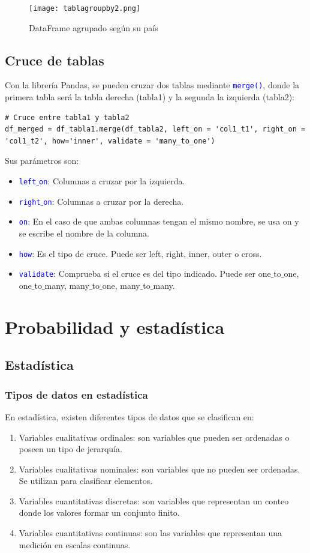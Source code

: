 \documentclass[a4paper, 12pt]{book}
\begin{document}
\begin{figure}[H] 
	\centering 
	\texttt{[image: tablagroupby2.png]}
	\caption{DataFrame agrupado según su país}
\end{figure}

\subsection{Cruce de tablas}
Con la librería Pandas, se pueden cruzar dos tablas mediante \texttt{\textcolor{blue}{merge()}}, donde la primera tabla será la tabla derecha (tabla1) y la segunda la izquierda (tabla2):
\begin{verbatim}
# Cruce entre tabla1 y tabla2
df_merged = df_tabla1.merge(df_tabla2, left_on = 'col1_t1', right_on = 'col1_t2', how='inner', validate = 'many_to_one')
\end{verbatim}
Sus parámetros son:
\begin{itemize}
	\item \texttt{\textcolor{blue}{left$\_$on}}: Columnas a cruzar por la izquierda.
	\item \texttt{\textcolor{blue}{right$\_$on}}: Columnas a cruzar por la derecha.
	\item \texttt{\textcolor{blue}{on}}: En el caso de que ambas columnas tengan el mismo nombre, se usa on y se escribe el nombre de la columna.
	\item \texttt{\textcolor{blue}{how}}: Es el tipo de cruce. Puede ser left, right, inner, outer o cross.
	\item \texttt{\textcolor{blue}{validate}}: Comprueba si el cruce es del tipo indicado. Puede ser one$\_$to$\_$one, one$\_$to$\_$many, many$\_$to$\_$one, many$\_$to$\_$many.
\end{itemize}

\section{Probabilidad y estadística}
\subsection{Estadística}
\subsubsection{Tipos de datos en estadística}
En estadística, existen diferentes tipos de datos que se clasifican en:
\begin{enumerate}
	\item Variables cualitativas ordinales: son variables que pueden ser ordenadas o poseen un tipo de jerarquía.
	\item Variables cualitativas nominales: son variables que no pueden ser ordenadas. Se utilizan para clasificar elementos.
	\item Variables cuantitativas discretas: son variables que representan un conteo donde los valores formar un conjunto finito.
	\item Variables cuantitativas continuas: son las variables que representan una medición en escalas continuas.
\end{enumerate}
\end{document}
